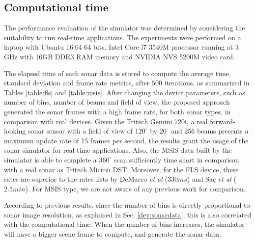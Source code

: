 \documentclass[final,5p,times]{elsarticle}
\begin{document}
\subsection{Computational time}

The performance evaluation of the simulator was determined by considering the suitability to run real-time applications. The experiments were performed on a laptop with Ubuntu 16.04 64 bits, Intel Core i7 3540M processor running at 3 GHz with 16GB DDR3 RAM memory and NVIDIA NVS 5200M video card.

The elapsed time of each sonar data is stored to compute the average time, standard deviation and frame rate metrics, after $500$ iterations, as summarized in Tables \ref{table:fls} and \ref{table:msis}. After changing the device parameters, such as number of bins, number of beams and field of view, the proposed approach generated the sonar frames with a high frame rate, for both sonar types, in comparison with real devices. Given the Tritech Gemini 720i, a real forward-looking sonar sensor with a field of view of $120^{\circ}$ by $20^{\circ}$ and 256 beams presents a maximum update rate of 15 frames per second, the results grant the usage of the sonar simulator for real-time applications. Also, the MSIS data built by the simulator is able to complete a $360^{\circ}$ scan sufficiently time short in comparison with a real sonar as Tritech Micron DST. Moreover, for the FLS device, these rates are superior to the rates lists by DeMarco \textit{et al} \cite{demarco2015} ($330 ms$) and Saç \textit{et al} \cite{sac2015} ($2.5 min$). For MSIS type, we are not aware of any previous work for comparison.

According to previous results, since the number of bins is directly proportional to sonar image resolution, as explained in Sec. \ref{dev:sonardata}, this is also correlated with the computational time. When the number of bins increases, the simulator will have a bigger scene frame to compute, and generate the sonar data.
\end{document}
